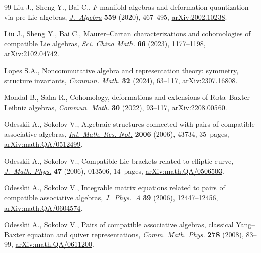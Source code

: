 \documentclass[10pt,a4paper]{amsart}
\numberwithin{equation}{section}
\begin{document}
\begin{thebibliography}{99}
Liu J., Sheng Y., Bai C., {$F$}-manifold algebras and deformation quantization
 via pre-{L}ie algebras, \href{https://doi.org/10.1016/j.jalgebra.2020.04.029}{\textit{J.~Algebra}} \textbf{559} (2020), 467--495,
 \href{https://arxiv.org/abs/2002.10238}{arXiv:2002.10238}.

Liu J., Sheng Y., Bai C., Maurer--{C}artan characterizations and cohomologies
 of compatible {L}ie algebras, \href{https://doi.org/10.1007/s11425-021-2014-5}{\textit{Sci. China Math.}} \textbf{66} (2023),
 1177--1198, \href{https://arxiv.org/abs/2102.04742}{arXiv:2102.04742}.

Lopes S.A., Noncommutative algebra and representation theory: symmetry,
 structure invariants, \href{https://doi.org/10.46298/cm.11678}{\textit{Commun. Math.}} \textbf{32} (2024), 63--117,
 \href{https://arxiv.org/abs/2307.16808}{arXiv:2307.16808}.

Mondal B., Saha R., Cohomology, deformations and extensions of {R}ota--{B}axter
 {L}eibniz algebras, \href{https://doi.org/10.46298/cm.10295}{\textit{Commun. Math.}} \textbf{30} (2022), 93--117,
 \href{https://arxiv.org/abs/2208.00560}{arXiv:2208.00560}.

Odesskii A., Sokolov V., Algebraic structures connected with pairs of
 compatible associative algebras, \href{https://doi.org/10.1155/IMRN/2006/43734}{\textit{Int. Math. Res. Not.}} \textbf{2006}
 (2006), 43734, 35~pages, \href{https://arxiv.org/abs/math.QA/0512499}{arXiv:math.QA/0512499}.

Odesskii A., Sokolov V., Compatible {L}ie brackets related to elliptic curve,
 \href{https://doi.org/10.1063/1.2158434}{\textit{J.~Math. Phys.}} \textbf{47} (2006), 013506, 14~pages,
 \href{https://arxiv.org/abs/math.QA/0506503}{arXiv:math.QA/0506503}.

Odesskii A., Sokolov V., Integrable matrix equations related to pairs of
 compatible associative algebras, \href{https://doi.org/10.1088/0305-4470/39/40/011}{\textit{J.~Phys.~A}} \textbf{39} (2006),
 12447--12456, \href{https://arxiv.org/abs/math.QA/0604574}{arXiv:math.QA/0604574}.

Odesskii A., Sokolov V., Pairs of compatible associative algebras, classical
 {Y}ang--{B}axter equation and quiver representations, \href{https://doi.org/10.1007/s00220-007-0361-9}{\textit{Comm. Math.
 Phys.}} \textbf{278} (2008), 83--99, \href{https://arxiv.org/abs/math.QA/0611200}{arXiv:math.QA/0611200}.


\end{thebibliography}
\end{document}
